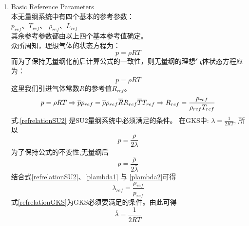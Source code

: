 \documentclass[a4paper,11pt]{article}
\begin{document}
\begin {enumerate}
    \item {Basic Reference Parameters} \\
        本无量纲系统中有四个基本的参考参数：\\
        $p_{ref}$、$T_{ref}$、 $\rho_{ref}$、$L_{ref}$ \\
        其余参考参数都由以上四个基本参考值确定。\\
        众所周知，理想气体的状态方程为：
        \begin{equation}
            p=\rho R T
        \end{equation}
        而为了保持无量纲化前后计算公式的一致性，则无量纲的理想气体状态方程应为：
        \begin{equation}
            \overline{p}=\overline{\rho} \overline{R} \overline{T}
        \end{equation}
        这里我们引进气体常数$R$的参考值$R_{ref}$。
        \begin{equation}\label{refrelationSU2}
            p=\rho R T \Rightarrow \overline{p}p_{ref}=\overline{\rho}\rho_{ref}\overline{R}R_{ref}\overline{T}T_{ref} \\
            \Rightarrow R_{ref} = \frac{p_{ref}}{\rho_{ref}T_{ref}}
        \end{equation}
        式.\eqref{refrelationSU2} 是SU2量纲系统中必须满足的条件。
        在GKS中: $\lambda=\frac{1}{2RT}$, 所以
        \begin{equation} \label{plambda1}
            p = \frac{\rho}{2\lambda}
        \end{equation}
        为了保持公式的不变性,无量纲后
        \begin{equation} \label{plambda2}
            \overline{p} = \frac{\overline{\rho}}{2\overline{\lambda}}
        \end{equation}
        结合式\eqref{refrelationSU2}、\eqref{plambda1} 与 \eqref{plambda2}可得
        \begin{equation}\label{refrelationGKS}
            \lambda_{ref} = \frac{\rho_{ref}}{p_{ref}}
        \end{equation}
        式\eqref{refrelationGKS}为GKS必须要满足的条件。由此可得
        \begin{equation}
            \overline{\lambda} = \frac{1}{2\overline{R}\overline{T}}
        \end{equation}


\end{enumerate}
\end{document}
